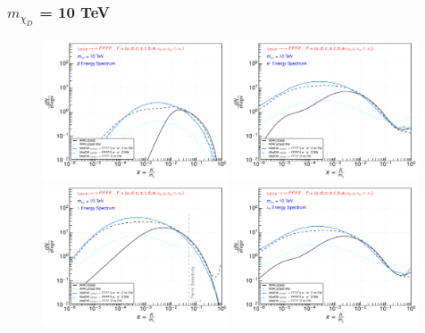 \documentclass[epj,nopacs,fleqn]{svjour}
\begin{document}
\subsubsection{ $m_{\chi_D}$ = 10 TeV}
\begin{figure}[!b]
\centering
\subfigure
{ \includegraphics[width=0.49\textwidth]{Fig/xdxd_FFFF_WZ/10_antiprotons_FFFF_10.pdf}}
\subfigure
{ \includegraphics[width=0.49\textwidth]{Fig/xdxd_FFFF_WZ/10_positrons_FFFF_10.pdf}}
\subfigure
{ \includegraphics[width=0.49\textwidth]{Fig/xdxd_FFFF_WZ/10_gammas_FFFF_10.pdf}}
\subfigure
{ \includegraphics[width=0.49\textwidth]{Fig/xdxd_FFFF_WZ/10_neutrinos_e_FFFF_10.pdf}}

\end{figure}
\end{document}
